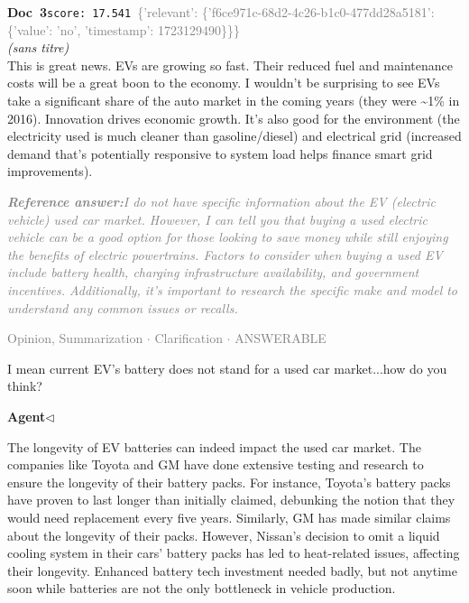 \documentclass[a4paper,11pt]{article}
\begin{document}
\begin{docenv}
{\footnotesize\textcolor{doccolor}{\textbf{Doc~3}}}\hfill{\tiny\texttt{score:~17.541}}\ {\tiny\textcolor{gray}{\{'relevant': \{'f6ce971c-68d2-4c26-b1c0-477dd28a5181': \{'value': 'no', 'timestamp': 1723129490\}\}\}}}\\[3pt]
{\small\textit{(sans titre)}}\\[2pt]
\vspace{2pt}
{\footnotesize 
This is great news.  EVs are growing so fast.  Their reduced fuel and maintenance costs will be a great boon to the economy.  I wouldn't be surprising to see EVs take a significant share of the auto market in the coming years (they were \textasciitilde{}1\% in 2016).  Innovation drives economic growth.  It's also good for the environment (the electricity used is much cleaner than gasoline/diesel) and electrical grid (increased demand that's potentially responsive to system load helps finance smart grid improvements).}
\end{docenv}
\begin{refanswerenv}
{\footnotesize\textit{\textcolor{gray}{\textbf{Reference answer:}\enspace I do not have specific information about the EV (electric vehicle) used car market. However, I can tell you that buying a used electric vehicle can be a good option for those looking to save money while still enjoying the benefits of electric powertrains. Factors to consider when buying a used EV include battery health, charging infrastructure availability, and government incentives. Additionally, it's important to research the specific make and model to understand any common issues or recalls.}}}
\end{refanswerenv}
\vspace{0.5em}
\hfill{\tiny\textcolor{gray}{Opinion, Summarization $\cdot$ Clarification $\cdot$ ANSWERABLE}}
\begin{userbubble}
I mean current EV's battery does not stand for a used car market...how do you think?
\end{userbubble}
\noindent\hfill{\small\textcolor{agentcolor}{\textbf{Agent\enspace$\triangleleft$}}}
\begin{agentbubble}
The longevity of EV batteries can indeed impact the used car market. The companies like Toyota and GM have done extensive testing and research to ensure the longevity of their battery packs. For instance, Toyota's battery packs have proven to last longer than initially claimed, debunking the notion that they would need replacement every five years. Similarly, GM has made similar claims about the longevity of their packs. However, Nissan's decision to omit a liquid cooling system in their cars' battery packs has led to heat-related issues, affecting their longevity.  Enhanced battery tech investment needed badly, but not anytime soon while batteries are not the only bottleneck in vehicle production.
\end{agentbubble}
\end{document}
